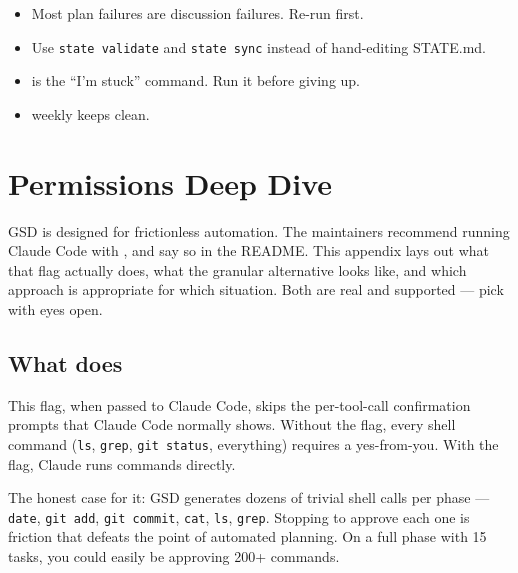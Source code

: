 \documentclass[11pt,letterpaper,openany]{book}
\begin{document}
\begin{gsdnote}[title=Key Takeaways]
\begin{itemize}[itemsep=2pt,leftmargin=1.2em]
  \item Most plan failures are discussion failures. Re-run  first.
  \item Use \texttt{state validate} and \texttt{state sync} instead of hand-editing STATE.md.
  \item {} is the ``I'm stuck'' command. Run it before giving up.
  \item {} weekly keeps  clean.
\end{itemize}
\end{gsdnote}

\appendix
\chapter{Permissions Deep Dive}

GSD is designed for frictionless automation. The maintainers recommend running Claude Code with \texttt{}, and say so in the README. This appendix lays out what that flag actually does, what the granular alternative looks like, and which approach is appropriate for which situation. Both are real and supported --- pick with eyes open.

\section{What  does}

This flag, when passed to Claude Code, skips the per-tool-call confirmation prompts that Claude Code normally shows. Without the flag, every shell command (\texttt{ls}, \texttt{grep}, \texttt{git status}, everything) requires a yes-from-you. With the flag, Claude runs commands directly.

The honest case for it: GSD generates dozens of trivial shell calls per phase --- \texttt{date}, \texttt{git add}, \texttt{git commit}, \texttt{cat}, \texttt{ls}, \texttt{grep}. Stopping to approve each one is friction that defeats the point of automated planning. On a full phase with 15 tasks, you could easily be approving 200+ commands.
\end{document}
